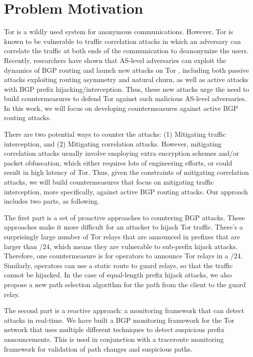 \section{Problem Motivation}

Tor is a wildly used system for anonymous communications. However, Tor is known to be vulnerable to traffic correlation attacks in which an adversary can correlate the traffic at both ends of the communication to deanonymize the users. Recently, researchers have shown that AS-level adversaries can exploit the dynamics of BGP routing and launch new attacks on Tor \cite{sun2015raptor}, including both passive attacks exploiting routing asymmetry and natural churn, as well as active attacks with BGP prefix hijacking/interception. Thus, these new attacks urge the need to build countermeasures to defend Tor against such malicious AS-level adversaries. In this work, we will focus on developing countermeasures against active BGP routing attacks. 

There are two potential ways to counter the attacks: (1) Mitigating traffic interception, and (2) Mitigating correlation attacks. However, mitigating correlation attacks usually involve employing extra encryption schemes and/or packet obfuscation, which either requires lots of engineering efforts, or could result in high latency of Tor. Thus, given the constraints of mitigating correlation attacks, we will build countermeasures that focus on mitigating traffic interception, more specifically, against active BGP routing attacks. Our approach includes two parts, as following. 

The first part is a set of proactive approaches to countering BGP attacks.  These approaches make it more difficult for an attacker to hijack Tor traffic.  There's a surprisingly large number  of Tor relays that are announced in prefixes that are larger than /24, which means they are vulnerable to sub-prefix hijack attacks.  Therefore, one countermeasure is for operators to announce Tor relays in a /24.  Similarly, operators can use a static route to guard relays, so that the traffic cannot be hijacked.  In the case of equal-length prefix hijack attacks, we also propose a new path selection algorithm for the path from the client to the guard relay.  

The second part is a reactive approach: a monitoring framework that can detect attacks in real-time.  We have built a BGP monitoring framework for the Tor network that uses multiple different techniques to detect suspicious prefix announcements.  This is used in conjunction with a traceroute monitoring framework for validation of path changes and suspicious paths.  

